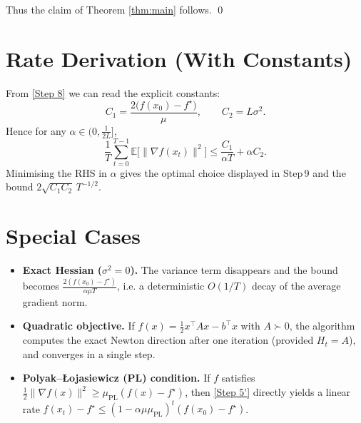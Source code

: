 \documentclass[11pt]{article}
\newcommand{\E}{\mathbb{E}}
\begin{document}
Thus the claim of Theorem \ref{thm:main} follows. \qed

\section*{Rate Derivation (With Constants)}
From \eqref{Step 8} we can read the explicit constants:
\[
C_{1}=\frac{2\big(f(x_{0})-f^{\star}\big)}{\mu},\qquad
C_{2}=L\sigma^{2}.
\]
Hence for any $\alpha\in\bigl(0,\frac{1}{2L}\bigr]$,
\[
\frac{1}{T}\sum_{t=0}^{T-1}\E\big[\|\nabla f(x_{t})\|^{2}\big]
\le \frac{C_{1}}{\alpha T}+ \alpha C_{2}.
\]
Minimising the RHS in $\alpha$ gives the optimal choice displayed in
Step 9 and the bound $2\sqrt{C_{1}C_{2}}\,T^{-1/2}$.

\section*{Special Cases}
\begin{itemize}
\item \textbf{Exact Hessian ($\sigma^{2}=0$).}  
The variance term disappears and the bound becomes
$\frac{2(f(x_{0})-f^{\star})}{\alpha\mu T}$, i.e. a deterministic
$O(1/T)$ decay of the average gradient norm.
\item \textbf{Quadratic objective.}  
If $f(x)=\frac12 x^{\top}Ax-b^{\top}x$ with $A\succ 0$, the algorithm computes the
exact Newton direction after one iteration (provided $H_{t}=A$), and
converges in a single step.
\item \textbf{Polyak–Łojasiewicz (PL) condition.}  
If $f$ satisfies $\frac12\|\nabla f(x)\|^{2}\ge \mu_{\text{PL}}(f(x)-f^{\star})$,
then \eqref{Step 5'} directly yields a linear rate
$f(x_{t})-f^{\star}\le (1-\alpha\mu\mu_{\text{PL}})^{t}(f(x_{0})-f^{\star})$.
\end{itemize}
\end{document}
